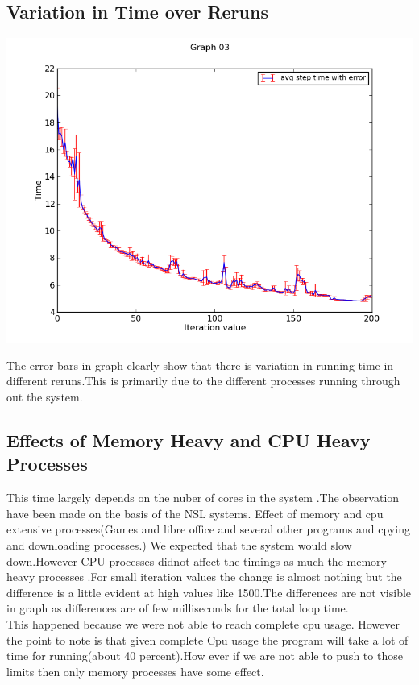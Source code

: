 \documentclass[11pt]{article}
\begin{document}
\subsection{Variation in Time over Reruns}
\begin{center}
  \includegraphics[scale=.75]{g03_plot03.png}
\end{center}
The error bars in graph clearly show that there is variation in running time in different reruns.This is primarily due to the different  processes running through out the system.
\subsection{Effects of Memory Heavy and CPU Heavy Processes}
This time largely depends on the nuber of cores in the system .The observation have been made on the basis of the NSL systems.
Effect of memory and cpu extensive processes(Games and libre office and several other programs and cpying and downloading processes.)
We expected that the system would slow down.However CPU processes didnot affect the timings as much the memory heavy processes .For small iteration values the change is almost nothing but the difference is a little evident at high values like 1500.The differences are not visible in graph as differences are of few milliseconds for the total loop time.\\
This happened because we were not able  to reach complete cpu usage.
However the point to note is that given complete Cpu usage the program will take a lot of time for running(about 40 percent).How ever if we are not able to push to those limits then only memory processes have some effect. 
\end{document}
